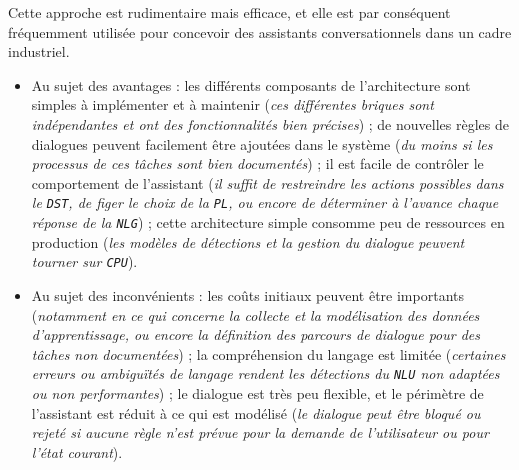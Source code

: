			
			Cette approche est rudimentaire mais efficace, et elle est par conséquent fréquemment utilisée pour concevoir des assistants conversationnels dans un cadre industriel.
			\begin{itemize}
				\item[\textcolor{colorDarkPastelGreen}{\textcolor{colorDarkPastelGreen}{\faThumbsUp}}] Au sujet des avantages :
					les différents composants de l'architecture sont simples à implémenter et à maintenir
					(\textit{ces différentes briques sont indépendantes et ont des fonctionnalités bien précises}) ;
					de nouvelles règles de dialogues peuvent facilement être ajoutées dans le système
					(\textit{du moins si les processus de ces tâches sont bien documentés}) ;
					il est facile de contrôler le comportement de l'assistant
					(\textit{il suffit de restreindre les actions possibles dans le \texttt{DST}, de figer le choix de la \texttt{PL}, ou encore de déterminer à l'avance chaque réponse de la \texttt{NLG}}) ;
					cette architecture simple consomme peu de ressources en production (\textit{les modèles de détections et la gestion du dialogue peuvent tourner sur \texttt{CPU}}).
				\item[\textcolor{colorDarkPastelRed}{\textcolor{colorDarkPastelRed}{\faThumbsDown}}] Au sujet des inconvénients :
					les coûts initiaux peuvent être importants (\textit{notamment en ce qui concerne la collecte et la modélisation des données d'apprentissage, ou encore la définition des parcours de dialogue pour des tâches non documentées}) ;
					la compréhension du langage est limitée (\textit{certaines erreurs ou ambiguïtés de langage rendent les détections du \texttt{NLU} non adaptées ou non performantes}) ;
					le dialogue est très peu flexible, et le périmètre de l'assistant est réduit à ce qui est modélisé (\textit{le dialogue peut être bloqué ou rejeté si aucune règle n'est prévue pour la demande de l'utilisateur ou pour l'état courant}).
			\end{itemize}
			
			\newpage
			
